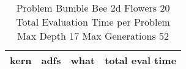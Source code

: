 \begin{table}[H]
\caption{Problem  Bumble Bee 2d  Flowers 20\\Total Evaluation Time per Problem \\ Max Depth 17 Max Generations 52\\}
\begin{center}
\scalebox{1.0} %
{
\begin{tabular}{lllr}
\hline
kern & adfs & what & total eval time \\
\hline


\end{tabular}
}
\end{center}
\end{table}


